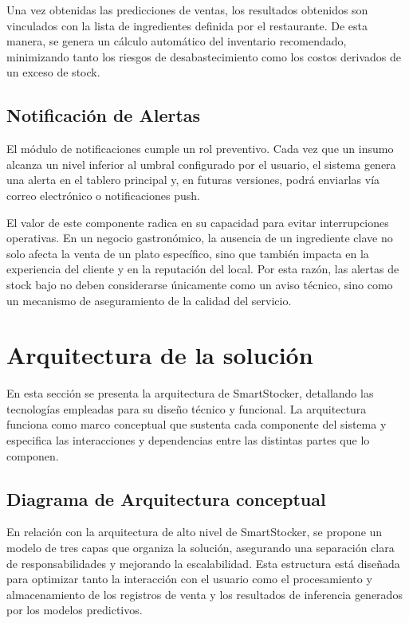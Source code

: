 Una vez obtenidas las predicciones de ventas, los resultados obtenidos son vinculados con la lista de ingredientes definida por el restaurante. De esta manera, se genera un cálculo automático del inventario recomendado, minimizando tanto los riesgos de desabastecimiento como los costos derivados de un exceso de stock. 

\subsection{Notificación de Alertas}\label{sec:alertas}

El módulo de notificaciones cumple un rol preventivo. Cada vez que un insumo alcanza un nivel inferior al umbral configurado por el usuario, el sistema genera una alerta en el tablero principal y, en futuras versiones, podrá enviarlas vía correo electrónico o notificaciones push.

El valor de este componente radica en su capacidad para evitar interrupciones operativas. En un negocio gastronómico, la ausencia de un ingrediente clave no solo afecta la venta de un plato específico, sino que también impacta en la experiencia del cliente y en la reputación del local. Por esta razón, las alertas de stock bajo no deben considerarse únicamente como un aviso técnico, sino como un mecanismo de aseguramiento de la calidad del servicio.


\section{Arquitectura de la solución}\label{sec:arquitectura-solucion}
En esta sección se presenta la arquitectura de SmartStocker, detallando las tecnologías empleadas para su diseño técnico y funcional. La arquitectura funciona como marco conceptual que sustenta cada componente del sistema y especifica las interacciones y dependencias entre las distintas partes que lo componen.

\subsection{Diagrama de Arquitectura conceptual}\label{sec:arquitectura-conceptual}
En relación con la arquitectura de alto nivel de SmartStocker, se propone un modelo de tres capas que organiza la solución, asegurando una separación clara de responsabilidades y mejorando la escalabilidad. Esta estructura está diseñada para optimizar tanto la interacción con el usuario como el procesamiento y almacenamiento de los registros de venta y los resultados de inferencia generados por los modelos predictivos.

